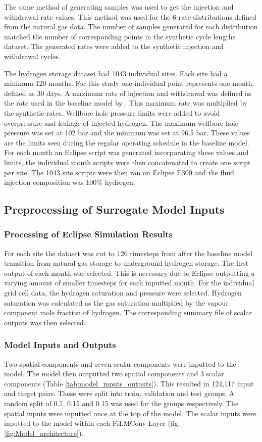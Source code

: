 The same method of generating samples was used to get the injection and withdrawal rate values. This method was used for the 6 rate distributions defined from the natural gas data. The number of samples generated for each distribution matched the number of corresponding points in the synthetic cycle lengths dataset. The generated rates were added to the synthetic injection and withdrawal cycles. 

The hydrogen storage dataset had 1043 individual sites. Each site had a minimum 120 months. For this study one individual point represents one month, defined as 30 days. A maximum rate of injection and withdrawal was defined as the rate used in the baseline model by \citet{Hogeweg_Benchmark}. This maximum rate was multiplied by the synthetic rates. Wellbore hole pressure limits were added to avoid overpressure and leakage of injected hydrogen. The maximum wellbore hole pressure was set at 102 bar and the minimum was set at 96.5 bar. These values are the limits seen during the regular operating schedule in the baseline model. For each month an Eclipse script was generated incorporating these values and limits, the individual month scripts were then concatenated to create one script per site. The 1043 site scripts were then ran on Eclipse E300 and the fluid injection composition was 100\% hydrogen. 

\subsection{Preprocessing of Surrogate Model Inputs}
\subsubsection{Processing of Eclipse Simulation Results}

For each site the dataset was cut to 120 timesteps from after the baseline model transition from natural gas storage to underground hydrogen storage. The first output of each month was selected. This is necessary due to Eclipse outputting a varying amount of smaller timesteps for each inputted month. For the individual grid cell data, the hydrogen saturation and pressure were selected. Hydrogen saturation was calculated as the gas saturation multiplied by the vapour component mole fraction of hydrogen. The corresponding summary file of scalar outputs was then selected.

\subsubsection{Model Inputs and Outputs}
Two spatial components and seven scalar components were inputted to the model. The model then outputted two spatial components and 3 scalar components (Table \ref{tab:model_inputs_outputs}). This resulted in 124,117 input and target pairs. These were split into train, validation and test groups. A random split of 0.7, 0.15 and 0.15 was used for the groups respectively. The spatial inputs were inputted once at the top of the model. The scalar inputs were inputted to the model within each FiLMConv Layer (fig. \ref{fig:Model_architecture}).  


